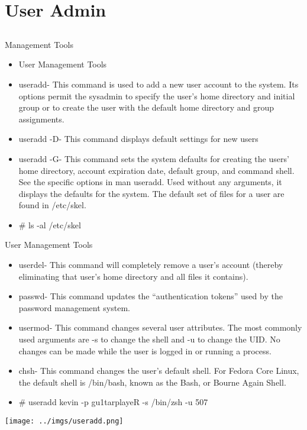 \documentclass{beamer}
\begin{document}
\section{User Admin}
\subsection{}
\begin{frame}{Management Tools}
\begin{itemize}
\item User Management Tools
\item useradd- This command is used to add a new user account to the system. Its options permit the sysadmin to specify the user's home directory and initial group or to create the user with the default home directory and group assignments.
\item useradd -D- This command displays default settings for new users
\item useradd -G- This command sets the system defaults for creating the users' home directory, account expiration date, default group, and command shell. See the specific options in man useradd. Used without any arguments, it displays the defaults for the system. The default set of files for a user are found in /etc/skel.
\item \# ls -al /etc/skel
\end{itemize}
\end{frame}

\begin{frame}{User Management Tools }
\begin{itemize}
\item userdel- This command will completely remove a user's account (thereby eliminating that user's home directory and all files it contains).
\item passwd- This command updates the ``authentication tokens'' used by the password management system.
\item usermod- This command changes several user attributes. The most commonly used arguments are -s to change the shell and -u to change the UID. No changes can be made while the user is logged in or running a process.
\item chsh- This command changes the user's default shell. For Fedora Core Linux, the default shell is /bin/bash, known as the Bash, or Bourne Again Shell.
\end{itemize}
\end{frame}

\begin{frame}{}
\begin{itemize}
\item \# useradd kevin -p gu1tarplayeR -s /bin/zsh -u 507
\end{itemize}
\texttt{[image: ../imgs/useradd.png]}
\end{frame}
\end{document}
